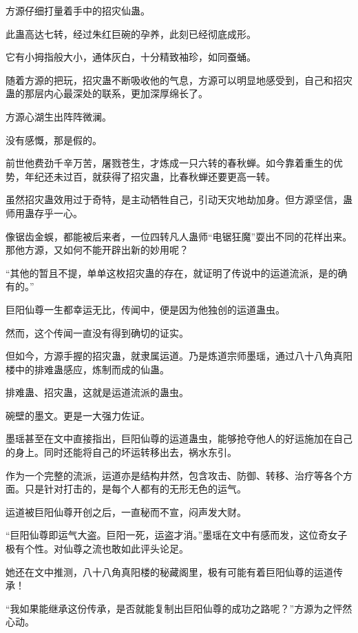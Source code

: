 
\begin{this_body}



方源仔细打量着手中的招灾仙蛊。

此蛊高达七转，经过朱红巨碗的孕养，此刻已经彻底成形。

它有小拇指般大小，通体灰白，十分精致袖珍，如同蚕蛹。

随着方源的把玩，招灾蛊不断吸收他的气息，方源可以明显地感受到，自己和招灾蛊的那层内心最深处的联系，更加深厚绵长了。

方源心湖生出阵阵微澜。

没有感慨，那是假的。

前世他费劲千辛万苦，屠戮苍生，才炼成一只六转的春秋蝉。如今靠着重生的优势，年纪还未过百，就获得了招灾蛊，比春秋蝉还要更高一转。

虽然招灾蛊效用过于奇特，是主动牺牲自己，引动天灾地劫加身。但方源坚信，蛊师用蛊存乎一心。

像锯齿金蜈，都能被后来者，一位四转凡人蛊师“电锯狂魔”耍出不同的花样出来。那他方源，又如何不能开辟出新的妙用呢？

“其他的暂且不提，单单这枚招灾蛊的存在，就证明了传说中的运道流派，是的确有的。”

巨阳仙尊一生都幸运无比，传闻中，便是因为他独创的运道蛊虫。

然而，这个传闻一直没有得到确切的证实。

但如今，方源手握的招灾蛊，就隶属运道。乃是炼道宗师墨瑶，通过八十八角真阳楼中的排难蛊感应，炼制而成的仙蛊。

排难蛊、招灾蛊，这就是运道流派的蛊虫。

碗壁的墨文。更是一大强力佐证。

墨瑶甚至在文中直接指出，巨阳仙尊的运道蛊虫，能够抢夺他人的好运施加在自己的身上。同时还能将自己的坏运转移出去，祸水东引。

作为一个完整的流派，运道亦是结构井然，包含攻击、防御、转移、治疗等各个方面。只是针对打击的，是每个人都有的无形无色的运气。

运道被巨阳仙尊开创之后，一直秘而不宣，闷声发大财。

“巨阳仙尊即运气大盗。巨阳一死，运盗才消。”墨瑶在文中有感而发，这位奇女子极有个性。对仙尊之流也敢如此评头论足。

她还在文中推测，八十八角真阳楼的秘藏阁里，极有可能有着巨阳仙尊的运道传承！

“我如果能继承这份传承，是否就能复制出巨阳仙尊的成功之路呢？”方源为之怦然心动。


\end{this_body}
